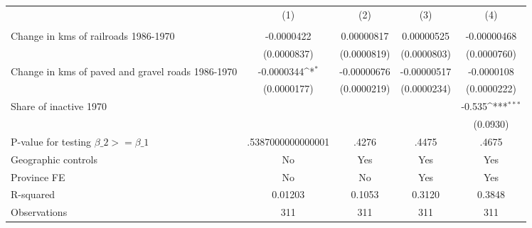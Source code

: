 {
\def\sym#1{\ifmmode^{#1}\else\(^{#1}\)\fi}
\begin{tabular}{l*{4}{c}}
\hline\hline
                &\multicolumn{1}{c}{(1)}&\multicolumn{1}{c}{(2)}&\multicolumn{1}{c}{(3)}&\multicolumn{1}{c}{(4)}\\
                &\multicolumn{1}{c}{}&\multicolumn{1}{c}{}&\multicolumn{1}{c}{}&\multicolumn{1}{c}{}\\
\hline
Change in kms of railroads 1986-1970&-0.0000422         &0.00000817         &0.00000525         &-0.00000468         \\
                &(0.0000837)         &(0.0000819)         &(0.0000803)         &(0.0000760)         \\
[1em]
Change in kms of paved and gravel roads 1986-1970&-0.0000344\sym{*}  &-0.00000676         &-0.00000517         &-0.0000108         \\
                &(0.0000177)         &(0.0000219)         &(0.0000234)         &(0.0000222)         \\
[1em]
Share of inactive 1970&                  &                  &                  &   -0.535\sym{***}\\
                &                  &                  &                  & (0.0930)         \\
\hline
P-value for testing $\beta\_{2} >= \beta\_{1}$&.5387000000000001         &    .4276         &    .4475         &    .4675         \\
Geographic controls&       No         &      Yes         &      Yes         &      Yes         \\
Province FE     &       No         &       No         &      Yes         &      Yes         \\
R-squared       &  0.01203         &   0.1053         &   0.3120         &   0.3848         \\
Observations    &      311         &      311         &      311         &      311         \\
\hline\hline
\end{tabular}
}
